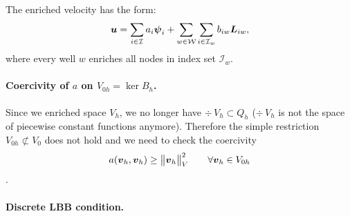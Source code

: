 The enriched velocity has the form:
\[
    \mathbf{\boldsymbol{u}} = 
    \sum \limits_{i\in\mathcal{I}} a_i \mathbf{\boldsymbol{\psi}}_i + 
    \sum \limits_{w\in\mathcal{W}} \sum \limits_{i\in\mathcal{I}_w} b_{iw} \mathbf{\boldsymbol{L}}_{iw},
\]
where every well $w$ enriches all nodes in index set $\mathcal{I}_w$.

\paragraph{Coercivity of $a$ on $V_{0h}=\ker B_h$.}
Since we enriched space $V_h$, we no longer have $\div\,V_{h}\subset Q_h$
($\div\,V_{h}$ is not the space of piecewise constant functions anymore).
Therefore the simple restriction $V_{0h}\not\subset V_0$ does not hold and 
we need to check the coercivity
\[a(\mathbf{\boldsymbol{v}}_h,\mathbf{\boldsymbol{v}}_h)\geq \bigl\Vert\mathbf{\boldsymbol{v}}_h\bigr\Vert^2_V  \qquad \forall \mathbf{\boldsymbol{v}}_h\in V_{0h}\].


\paragraph{Discrete LBB condition.}


